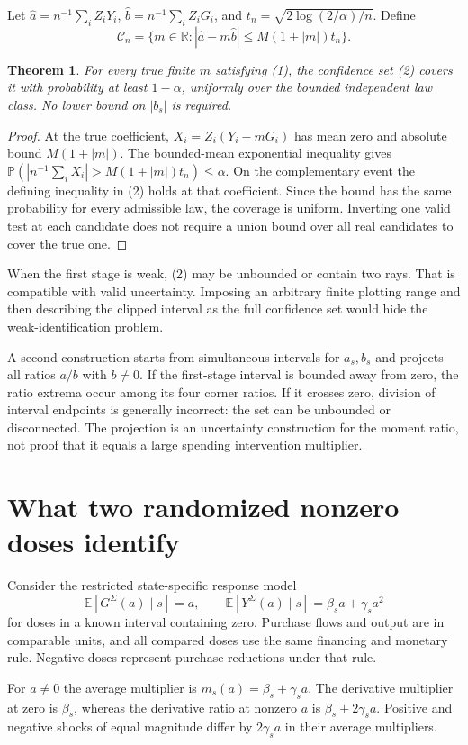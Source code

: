 \documentclass[11pt,a4paper]{article}
\newtheorem{theorem}{Theorem}[section]
\newcommand{\R}{\mathbb R}
\newcommand{\E}{\mathbb E}
\newcommand{\Prob}{\mathbb P}
\begin{document}
Let $\widehat a=n^{-1}\sum_iZ_iY_i$, $\widehat b=n^{-1}\sum_iZ_iG_i$, and
$t_n=\sqrt{2\log(2/\alpha)/n}$. Define
\[
 \mathcal C_n=\{m\in\R:
 |\widehat a-m\widehat b|\le M(1+|m|)t_n\}.
 \tag{2}
\]
\begin{theorem}
For every true finite $m$ satisfying (1), the confidence set (2) covers it with probability at least $1-\alpha$, uniformly over the bounded independent law class. No lower bound on $|b_s|$ is required.
\end{theorem}
\begin{proof}
At the true coefficient, $X_i=Z_i(Y_i-mG_i)$ has mean zero and absolute bound $M(1+|m|)$. The bounded-mean exponential inequality gives
$\Prob(|n^{-1}\sum_iX_i|>M(1+|m|)t_n)\le\alpha$.
On the complementary event the defining inequality in (2) holds at that coefficient. Since the bound has the same probability for every admissible law, the coverage is uniform. Inverting one valid test at each candidate does not require a union bound over all real candidates to cover the true one.
\end{proof}
When the first stage is weak, (2) may be unbounded or contain two rays. That is compatible with valid uncertainty. Imposing an arbitrary finite plotting range and then describing the clipped interval as the full confidence set would hide the weak-identification problem.

A second construction starts from simultaneous intervals for $a_s,b_s$ and projects all ratios $a/b$ with $b\ne0$. If the first-stage interval is bounded away from zero, the ratio extrema occur among its four corner ratios. If it crosses zero, division of interval endpoints is generally incorrect: the set can be unbounded or disconnected. The projection is an uncertainty construction for the moment ratio, not proof that it equals a large spending intervention multiplier.
\section{What two randomized nonzero doses identify}
Consider the restricted state-specific response model
\[
 \E[G^\Sigma(a)\mid s]=a,\qquad
 \E[Y^\Sigma(a)\mid s]=\beta_s a+\gamma_s a^2
 \tag{3}
\]
for doses in a known interval containing zero. Purchase flows and output are in comparable units, and all compared doses use the same financing and monetary rule. Negative doses represent purchase reductions under that rule.

For $a\ne0$ the average multiplier is
$m_s(a)=\beta_s+\gamma_s a$.
The derivative multiplier at zero is $\beta_s$, whereas the derivative ratio at nonzero $a$ is $\beta_s+2\gamma_sa$. Positive and negative shocks of equal magnitude differ by $2\gamma_sa$ in their average multipliers.
\end{document}
